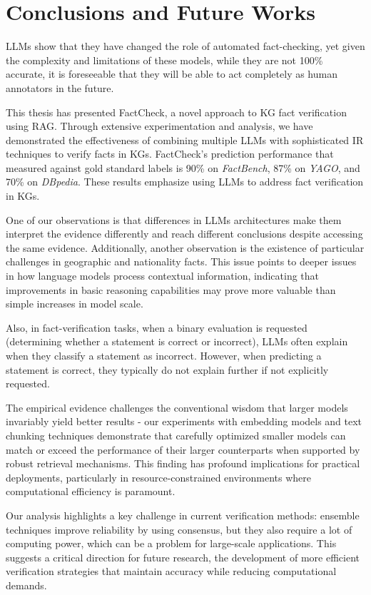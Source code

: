 \chapter{Conclusions and Future Works}\label{ch:conclusions}
\acp{LLM} show that they have changed the role of automated fact-checking, yet given the complexity and limitations of these models, while they are not 100\% accurate, it is foreseeable that they will be able to act completely as human annotators in the future.

This thesis has presented FactCheck, a novel approach to \ac{KG} fact verification using RAG.
Through extensive experimentation and analysis, we have demonstrated the effectiveness of combining multiple \acp{LLM} with sophisticated \ac{IR} techniques to verify facts in \acp{KG}.
FactCheck's prediction performance that measured against gold standard labels is 90\% on \textit{FactBench}, 87\% on \textit{YAGO}, and 70\% on \textit{DBpedia}.
These results emphasize using \acp{LLM} to address fact verification in \acp{KG}.

One of our observations is that differences in \acp{LLM} architectures make them interpret the evidence differently and reach different conclusions despite accessing the same evidence.
Additionally, another observation is the existence of particular challenges in geographic and nationality facts.
This issue points to deeper issues in how language models process contextual information, indicating that improvements in basic reasoning capabilities may prove more valuable than simple increases in model scale.

Also, in fact-verification tasks, when a binary evaluation is requested (\ie determining whether a statement is correct or incorrect), \acp{LLM} often explain when they classify a statement as incorrect.
However, when predicting a statement is correct, they typically do not explain further if not explicitly requested.

The empirical evidence challenges the conventional wisdom that larger models invariably yield better results - our experiments with embedding models and text chunking techniques demonstrate that carefully optimized smaller models can match or exceed the performance of their larger counterparts when supported by robust retrieval mechanisms.
This finding has profound implications for practical deployments, particularly in resource-constrained environments where computational efficiency is paramount.

Our analysis highlights a key challenge in current verification methods: ensemble techniques improve reliability by using consensus, but they also require a lot of computing power, which can be a problem for large-scale applications.
This suggests a critical direction for future research, the development of more efficient verification strategies that maintain accuracy while reducing computational demands.

